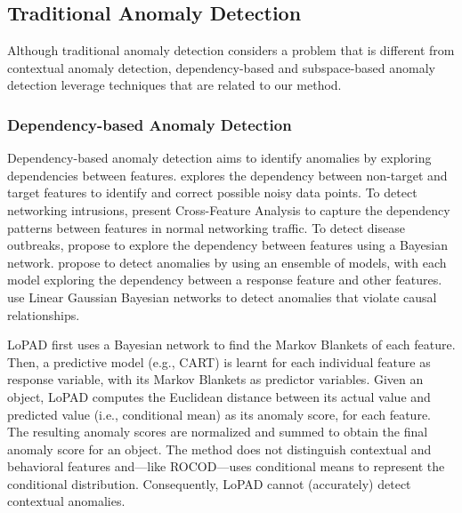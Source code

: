 \documentclass[pdflatex,sn-basic]{sn-jnl}%
\theoremstyle{thmstyleone}%
\theoremstyle{thmstyletwo}%
\theoremstyle{thmstylethree}%
\begin{document}
\subsection{Traditional Anomaly Detection}

Although traditional anomaly detection considers a problem that is different from contextual anomaly detection, dependency-based and subspace-based anomaly detection leverage techniques that are related to our method.

\subsubsection{Dependency-based Anomaly Detection}
Dependency-based anomaly detection aims to identify anomalies by exploring dependencies between features. \cite{teng1999correcting} explores the dependency between non-target and target features to identify and correct possible noisy data points. To detect networking intrusions, \cite{huang2003cross} present Cross-Feature Analysis to capture the dependency patterns between features in normal networking traffic. To detect disease outbreaks, \cite{wong2003bayesian} propose to explore the dependency between features using a Bayesian network. \cite{noto2010anomaly} propose to detect anomalies by using an ensemble of models, with each model exploring the dependency between a response feature and other features. \cite{babbar2012mining} use Linear Gaussian Bayesian networks to detect anomalies that violate causal relationships. 

LoPAD \citep{lu2020lopad} first uses a Bayesian network to find the Markov Blankets of each feature. Then, a predictive model (e.g., CART) is learnt for each individual feature as response variable, with its Markov Blankets as predictor variables. Given an object, LoPAD computes the Euclidean distance between its actual value and predicted value (i.e., conditional mean) as its anomaly score, for each feature. The resulting anomaly scores are normalized and summed to obtain the final anomaly score for an object. The method does not distinguish contextual and behavioral features and---like ROCOD---uses conditional means to represent the conditional distribution. Consequently, LoPAD cannot (accurately) detect contextual anomalies.
\end{document}
